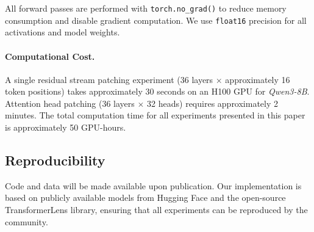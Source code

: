 \documentclass[11pt]{article}
\begin{document}
All forward passes are performed with \texttt{torch.no\_grad()} to reduce memory consumption and disable gradient computation. We use \texttt{float16} precision for all activations and model weights.

\paragraph{Computational Cost.}
A single residual stream patching experiment (36 layers $\times$ approximately 16 token positions) takes approximately 30 seconds on an H100 GPU for \textit{Qwen3-8B}. Attention head patching (36 layers $\times$ 32 heads) requires approximately 2 minutes. The total computation time for all experiments presented in this paper is approximately 50 GPU-hours.

\subsection{Reproducibility}
\label{sec:appendix_reproducibility}       

Code and data will be made available upon publication. Our implementation is based on publicly available models from Hugging Face and the open-source TransformerLens library, ensuring that all experiments can be reproduced by the community.
\end{document}
